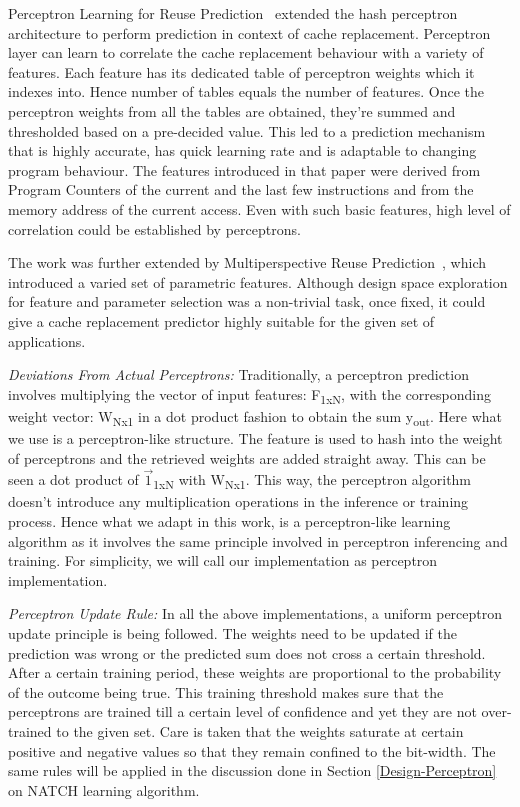 Perceptron Learning for Reuse Prediction~\cite{Perc_Reuse} extended the
hash perceptron architecture to perform prediction in context of cache
replacement.  Perceptron layer can learn to correlate the cache
replacement behaviour with a variety of features.  Each feature has
its dedicated table of perceptron weights which it indexes into.
Hence number of tables equals the number of features.  Once the
perceptron weights from all the tables are obtained, they're summed
and thresholded based on a pre-decided value.  This led to a
prediction mechanism that is highly accurate, has quick learning rate
and is adaptable to changing program behaviour.  The features
introduced in that paper were derived from Program Counters of the
current and the last few instructions and from the memory address of the
current access.  Even with such basic features, high level of
correlation could be established by perceptrons.

The work was further extended by Multiperspective Reuse
Prediction~\cite{Multiperspective}, which introduced a varied set of
parametric features.  Although design space exploration for feature
and parameter selection was a non-trivial task, once fixed, it could
give a cache replacement predictor highly suitable for the given set
of applications.

\textit{Deviations From Actual Perceptrons:} Traditionally, a
perceptron prediction involves multiplying the vector of input
features: F\textsubscript{1xN}, with the corresponding weight vector:
W\textsubscript{Nx1} in a dot product fashion to obtain the sum
y\textsubscript{out}.  Here what we use is a perceptron-like
structure.  The feature is used to hash into the weight of perceptrons
and the retrieved weights are added straight away.  This can be seen a
dot product of $\vec{1}$\textsubscript{1xN} with W\textsubscript{Nx1}.
This way, the perceptron algorithm doesn't introduce any
multiplication operations in the inference or training process.  Hence
what we adapt in this work, is a perceptron-like learning algorithm as
it involves the same principle involved in perceptron inferencing and
training.  For simplicity, we will call our implementation as
perceptron implementation.

\textit{Perceptron Update Rule:} In all the above implementations, a
uniform perceptron update principle is being followed.  The weights
need to be updated if the prediction was wrong or the predicted sum
does not cross a certain threshold.  After a certain training period,
these weights are proportional to the probability of the outcome being
true.  This training threshold makes sure that the perceptrons are
trained till a certain level of confidence and yet they are not
over-trained to the given set.  Care is taken that the weights
saturate at certain positive and negative values so that they remain
confined to the bit-width.  The same rules will be applied in the
discussion done in Section \ref{Design-Perceptron} on NATCH learning algorithm.


